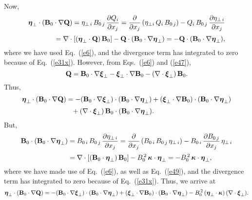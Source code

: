 \documentclass[12pt,prb,aps,notitlepage]{revtex4-1}
\newcommand{\bxi}{\mbox{\boldmath$\xi$}}
\newcommand{\bta}{\mbox{\boldmath$\eta$}}
\newcommand{\bkappa}{\mbox{\boldmath$\kappa$}}
\begin{document}
Now,
\begin{align}
\bta_\perp\cdot({\bf B}_0\cdot\nabla{\bf Q}) 
= \eta_{\perp\,i}\,B_{0\,j}\,\frac{\partial Q_i}{\partial x_j}=
\frac{\partial}{\partial x_j}\,(\eta_{\perp i}\,Q_i\,B_{0\,j})
- Q_i\,B_{0\,j}\,\frac{\partial\eta_{\perp\,i}}{\partial x_j}\nonumber\\[0.5ex]
= \nabla\cdot[(\bta_\perp\cdot {\bf Q})\,{\bf B}_0] - {\bf Q}\cdot ({\bf B}_0\cdot\nabla \bta_\perp)=- {\bf Q}\cdot ({\bf B}_0\cdot\nabla \bta_\perp),
\end{align}
where we have  used Eq.~(\ref{e6}), and the divergence term has integrated to zero because of Eq.~(\ref{e31x}). 
However, from Eqs.~(\ref{e6}) and (\ref{e47}),
\begin{equation}\label{e53}
{\bf Q}  ={\bf B}_0\cdot\nabla \bxi_\perp - \bxi_\perp\cdot\nabla {\bf B}_0 - (\nabla\cdot\bxi_\perp)\,{\bf B}_0.
\end{equation}
Thus,
\begin{align}
\bta_\perp \cdot({\bf B}_0\cdot\nabla {\bf Q})&=- ({\bf B}_0\cdot\nabla\bxi_\perp)\cdot({\bf B}_0\cdot\nabla \bta_\perp)+ (\bxi_\perp\cdot\nabla {\bf B}_0)\cdot({\bf B}_0\cdot\nabla \bta_\perp) \nonumber\\[0.5ex]
&\phantom{=}+ (\nabla\cdot\bxi_\perp)\,{\bf B}_0\cdot({\bf B}_0\cdot\nabla \bta_\perp). 
\end{align}
But,
\begin{align}
{\bf B}_0\cdot({\bf B}_0\cdot\nabla \bta_\perp)&= B_{0\,i}\,B_{0\,j}\,\frac{\partial \eta_{\perp\,i}}{\partial x_j}= \frac{\partial}{\partial x_j}\,( B_{0\,i}\,B_{0\,j}\, \eta_{\perp\,i}) - B_{0\,i}\,\frac{\partial B_{0\,j}}{\partial x_j}\,\eta_{\perp\,i}\nonumber\\[0.5ex]
&= \nabla\cdot [({\bf B}_0\cdot\bta_\perp)\,{\bf B}_0] -B_0^{\,2}\,\bkappa\cdot \bta_\perp=-B_0^{\,2}\,\bkappa\cdot \bta_\perp,
\end{align}
where we have made use of Eq.~(\ref{e6}), as well as Eq.~(\ref{e49}), and the divergence term has integrated to zero because of Eq.~(\ref{e31x}). Thus, we arrive at
\begin{equation}\label{e56}
\bta_\perp \cdot({\bf B}_0\cdot\nabla {\bf Q})=- ({\bf B}_0\cdot\nabla\bxi_\perp)\cdot({\bf B}_0\cdot\nabla \bta_\perp)+ (\bxi_\perp\cdot\nabla {\bf B}_0)\cdot({\bf B}_0\cdot\nabla \bta_\perp) - B_0^{\,2}\,(\bta_\perp\cdot\bkappa)\,(\nabla\cdot\bxi_\perp).
\end{equation}
\end{document}
